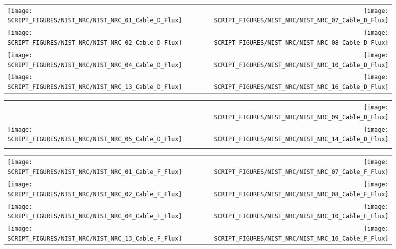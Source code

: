 \begin{figure}[p]
\begin{tabular*}{\textwidth}{l@{\extracolsep{\fill}}r}
\texttt{[image: SCRIPT\_FIGURES/NIST\_NRC/NIST\_NRC\_01\_Cable\_D\_Flux]} &
\texttt{[image: SCRIPT\_FIGURES/NIST\_NRC/NIST\_NRC\_07\_Cable\_D\_Flux]} \\
\texttt{[image: SCRIPT\_FIGURES/NIST\_NRC/NIST\_NRC\_02\_Cable\_D\_Flux]} &
\texttt{[image: SCRIPT\_FIGURES/NIST\_NRC/NIST\_NRC\_08\_Cable\_D\_Flux]} \\
\texttt{[image: SCRIPT\_FIGURES/NIST\_NRC/NIST\_NRC\_04\_Cable\_D\_Flux]} &
\texttt{[image: SCRIPT\_FIGURES/NIST\_NRC/NIST\_NRC\_10\_Cable\_D\_Flux]} \\
\texttt{[image: SCRIPT\_FIGURES/NIST\_NRC/NIST\_NRC\_13\_Cable\_D\_Flux]} &
\texttt{[image: SCRIPT\_FIGURES/NIST\_NRC/NIST\_NRC\_16\_Cable\_D\_Flux]}
\end{tabular*}
\label{NIST_NRC_Cable_D_Flux_Closed}
\end{figure}

\begin{figure}[p]
\begin{tabular*}{\textwidth}{l@{\extracolsep{\fill}}r}
                           &
\texttt{[image: SCRIPT\_FIGURES/NIST\_NRC/NIST\_NRC\_09\_Cable\_D\_Flux]} \\
\texttt{[image: SCRIPT\_FIGURES/NIST\_NRC/NIST\_NRC\_05\_Cable\_D\_Flux]} &
\texttt{[image: SCRIPT\_FIGURES/NIST\_NRC/NIST\_NRC\_14\_Cable\_D\_Flux]} \\
                      &
\end{tabular*}
\label{NIST_NRC_Cable_D_Flux_Open}
\end{figure}

\begin{figure}[p]
\begin{tabular*}{\textwidth}{l@{\extracolsep{\fill}}r}
\texttt{[image: SCRIPT\_FIGURES/NIST\_NRC/NIST\_NRC\_01\_Cable\_F\_Flux]} &
\texttt{[image: SCRIPT\_FIGURES/NIST\_NRC/NIST\_NRC\_07\_Cable\_F\_Flux]} \\
\texttt{[image: SCRIPT\_FIGURES/NIST\_NRC/NIST\_NRC\_02\_Cable\_F\_Flux]} &
\texttt{[image: SCRIPT\_FIGURES/NIST\_NRC/NIST\_NRC\_08\_Cable\_F\_Flux]} \\
\texttt{[image: SCRIPT\_FIGURES/NIST\_NRC/NIST\_NRC\_04\_Cable\_F\_Flux]} &
\texttt{[image: SCRIPT\_FIGURES/NIST\_NRC/NIST\_NRC\_10\_Cable\_F\_Flux]} \\
\texttt{[image: SCRIPT\_FIGURES/NIST\_NRC/NIST\_NRC\_13\_Cable\_F\_Flux]} &
\texttt{[image: SCRIPT\_FIGURES/NIST\_NRC/NIST\_NRC\_16\_Cable\_F\_Flux]}
\end{tabular*}
\label{NIST_NRC_Cable_F_Flux_Closed}
\end{figure}

